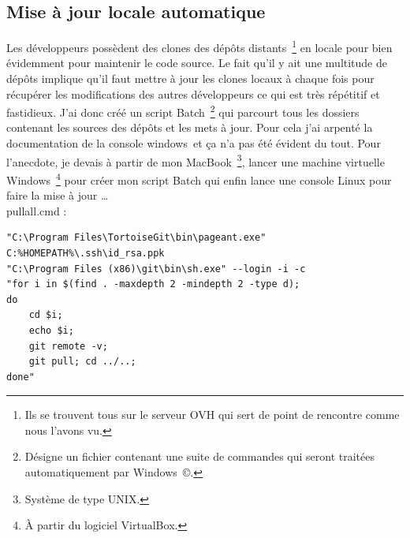 \subsection{Mise à jour locale automatique} %

Les développeurs possèdent des clones des dépôts distants\, \footnote{Ils se
trouvent tous sur le serveur OVH qui sert de point de rencontre comme nous
l'avons vu.} en locale pour bien évidemment pour maintenir le code source. Le
fait qu'il y ait une multitude de dépôts implique qu'il faut mettre à jour les
clones locaux à chaque fois pour récupérer les modifications des autres
développeurs ce qui est très répétitif et fastidieux. J'ai donc créé un script
Batch\, \footnote{Désigne un fichier contenant une suite de commandes qui
seront traitées automatiquement par Windows\, \copyright.} qui parcourt tous les
dossiers contenant les sources des dépôts et les mets à jour. Pour cela j'ai
arpenté la documentation de la console windows\, et ça n'a pas été évident du
tout. Pour l'anecdote, je devais à partir de mon MacBook\, \footnote{Système de
type UNIX.}, lancer une machine virtuelle Windows\, \footnote{À partir du
logiciel VirtualBox.} pour créer mon script Batch qui enfin lance une console
Linux pour faire la mise à jour \ldots{} \\
pullall.cmd :
\begin{lstlisting}
"C:\Program Files\TortoiseGit\bin\pageant.exe"
C:%HOMEPATH%\.ssh\id_rsa.ppk
"C:\Program Files (x86)\git\bin\sh.exe" --login -i -c
"for i in $(find . -maxdepth 2 -mindepth 2 -type d);
do
    cd $i;
    echo $i;
    git remote -v;
    git pull; cd ../..;
done"
\end{lstlisting}

\clearpage
